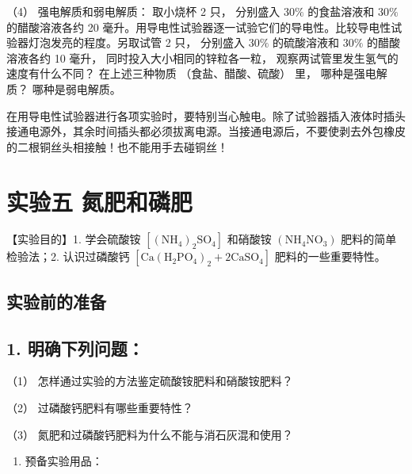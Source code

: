 （4） 强电解质和弱电解质： 取小烧杯 2 只， 分别盛入 \(30\%\)
的食盐溶液和 \(30\%\) 的醋酸溶液各约 20
毫升。用导电性试验器逐一试验它们的导电性。比较导电性试验器灯泡发亮的程度。另取试管
2 只， 分别盛入 \(30\%\) 的硫酸溶液和 \(30\%\) 的醋酸溶液各约 10 毫升，
同时投入大小相同的锌粒各一粒， 观察两试管里发生氢气的速度有什么不同？
在上述三种物质 （食盐、醋酸、硫酸） 里， 哪种是强电解质？
哪种是弱电解质。

在用导电性试验器进行各项实验时，要特别当心触电。除了试验器插入液体时插头接通电源外，其余时间插头都必须拔离电源。当接通电源后，不要使剥去外包橡皮的二根铜丝头相接触！也不能用手去碰铜丝！

\section{实验五 氮肥和磷肥}

【实验目的】1. 学会硫酸铵
\(\left[\left(\mathrm{NH}_{4}\right)_{2}\mathrm{SO}_{4}\right]\)
和硝酸铵 \(\left(\mathrm{NH}_{4}\mathrm{NO}_{3}\right)\)
肥料的简单检验法；2. 认识过磷酸钙
\(\left[\mathrm{Ca}\left(\mathrm{H}_{2}\mathrm{PO}_{4}\right)_{2}+2\mathrm{CaSO}_{4}\right]\)
肥料的一些重要特性。

\subsection{实验前的准备}

\subsection{1. 明确下列问题：}

（1） 怎样通过实验的方法鉴定硫酸铵肥料和硝酸铵肥料？

（2） 过磷酸钙肥料有哪些重要特性？

（3） 氮肥和过磷酸钙肥料为什么不能与消石灰混和使用？

\begin{enumerate}[start=2]
\item
  预备实验用品：
\end{enumerate}

